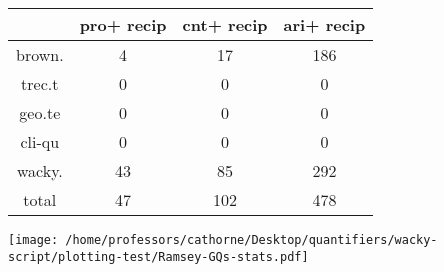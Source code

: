 \documentclass[a4,10pt]{article}
\begin{document}
\begin{sidewaystable}[p]
\tiny{\begin{tabular}{|c|c|c|c|}
 & pro+
recip & cnt+
recip & ari+
recip\\
\hline
brown. & 4 & 17 & 186\\
trec.t & 0 & 0 & 0\\
geo.te & 0 & 0 & 0\\
cli-qu & 0 & 0 & 0\\
wacky. & 43 & 85 & 292\\
\hline
total & 47 & 102 & 478
\end{tabular}}
\end{sidewaystable}



\vspace{0.2cm}

\begin{center}
\texttt{[image: /home/professors/cathorne/Desktop/quantifiers/wacky-script/plotting-test/Ramsey-GQs-stats.pdf]}
\end{center}
\end{document}
